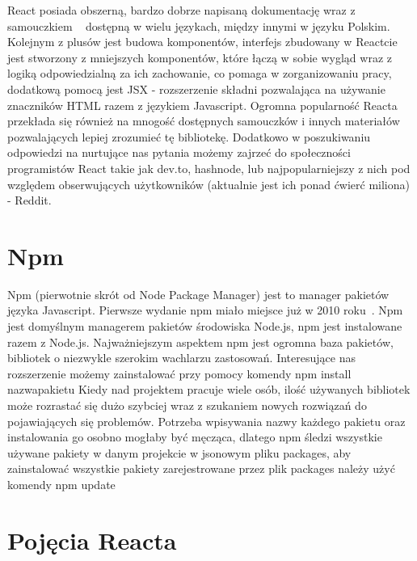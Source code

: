\documentclass[oneside,polski,logo,indent]{amuthesis}
\begin{document}
\begin{enumerate}
\begin{enumerate}
{React posiada obszerną, bardzo dobrze napisaną dokumentację wraz z samouczkiem 
~\cite{reactjs} dostępną w wielu językach, między innymi w języku Polskim.
Kolejnym z plusów jest budowa komponentów, interfejs zbudowany w Reactcie jest stworzony z mniejszych komponentów, które łączą w sobie wygląd wraz z logiką odpowiedzialną za ich zachowanie, co pomaga w zorganizowaniu pracy, dodatkową pomocą jest JSX - rozszerzenie składni pozwalająca na używanie znaczników HTML razem z językiem Javascript.
Ogromna popularność Reacta przekłada się również na mnogość dostępnych samouczków i innych materiałów pozwalających lepiej zrozumieć tę bibliotekę. Dodatkowo w poszukiwaniu odpowiedzi na nurtujące nas pytania możemy zajrzeć do społeczności programistów React takie jak dev.to, hashnode, lub najpopularniejszy z nich pod względem obserwujących użytkowników (aktualnie jest ich ponad ćwierć miliona) - Reddit.

}



\section{Npm}{

Npm (pierwotnie skrót od Node Package Manager) jest to manager pakietów języka Javascript. Pierwsze wydanie npm miało miejsce już w 2010 roku~\cite{npmwiki}.
Npm jest domyślnym managerem pakietów środowiska Node.js, npm jest instalowane razem z Node.js. Najważniejszym aspektem npm jest ogromna baza pakietów, bibliotek o 
niezwykle szerokim wachlarzu zastosowań. Interesujące nas rozszerzenie możemy zainstalować przy pomocy komendy
\newline
npm install nazwapakietu
\newline
Kiedy nad projektem pracuje wiele osób, ilość używanych bibliotek może rozrastać się dużo szybciej wraz z szukaniem nowych rozwiązań do pojawiających się problemów.
Potrzeba wpisywania nazwy każdego pakietu oraz instalowania go osobno mogłaby być męcząca, dlatego npm śledzi wszystkie używane pakiety w danym projekcie w jsonowym pliku
packages, aby zainstalować wszystkie pakiety zarejestrowane przez plik packages należy użyć komendy
\newline
npm update
\newline





}



\section{Pojęcia Reacta}





\end{enumerate}
\end{enumerate}
\end{document}
